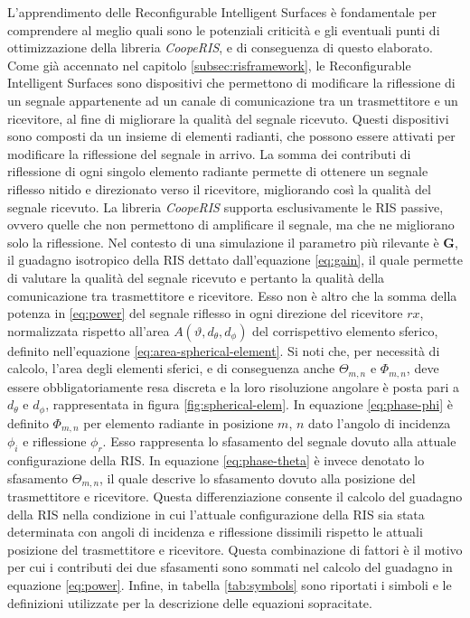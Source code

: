 L'apprendimento delle Reconfigurable Intelligent Surfaces è fondamentale per comprendere
al meglio quali sono le potenziali criticità e gli eventuali punti di ottimizzazione
della libreria \textit{CoopeRIS}, e di conseguenza di questo elaborato. Come già
accennato nel capitolo \ref{subsec:risframework}, le Reconfigurable Intelligent Surfaces
sono dispositivi che permettono di modificare la riflessione di un segnale appartenente
ad un canale di comunicazione tra un trasmettitore e un ricevitore, al fine di
migliorare la qualità del segnale ricevuto. Questi dispositivi sono composti da un
insieme di elementi radianti, che possono essere attivati per modificare la
riflessione del segnale in arrivo. La somma dei contributi di riflessione di ogni
singolo elemento radiante permette di ottenere un segnale riflesso nitido e direzionato
verso il ricevitore, migliorando così la qualità del segnale ricevuto. La libreria
\textit{CoopeRIS} supporta esclusivamente le RIS passive, ovvero quelle che non permettono
di amplificare il segnale, ma che ne migliorano solo la riflessione. Nel contesto
di una simulazione il parametro più rilevante è $\textbf{G}$, il guadagno
isotropico della RIS dettato dall'equazione \ref{eq:gain}, il quale permette di valutare
la qualità del segnale ricevuto e pertanto la qualità della comunicazione tra trasmettitore
e ricevitore. Esso non è altro che la somma della potenza in \ref{eq:power} del
segnale riflesso in ogni direzione del ricevitore $rx$, normalizzata rispetto all'area
$A(\vartheta, d_{\theta}, d_{\phi})$ del corrispettivo elemento sferico,
definito nell'equazione \ref{eq:area-spherical-element}. Si noti che, per
necessità di calcolo, l'area degli elementi sferici, e di conseguenza anche
$\Theta_{m,n}$ e $\Phi_{m,n}$, deve essere obbligatoriamente resa discreta e la loro
risoluzione angolare è posta pari a $d_{\theta}$ e $d_{\phi}$, rappresentata in
figura \ref{fig:spherical-elem}. In equazione \ref{eq:phase-phi} è definito $\Phi
_{m,n}$ per elemento radiante in posizione $m$, $n$ dato l'angolo di incidenza
$\phi_{i}$ e riflessione $\phi_{r}$. Esso rappresenta lo sfasamento del segnale dovuto
alla attuale configurazione della RIS. In equazione \ref{eq:phase-theta} è
invece denotato lo sfasamento $\Theta_{m,n}$, il quale descrive lo sfasamento dovuto
alla posizione del trasmettitore e ricevitore. Questa differenziazione consente
il calcolo del guadagno della RIS nella condizione in cui l'attuale
configurazione della RIS sia stata determinata con angoli di incidenza e
riflessione dissimili rispetto le attuali posizione del trasmettitore e
ricevitore. Questa combinazione di fattori è il motivo per cui i contributi dei due
sfasamenti sono sommati nel calcolo del guadagno in equazione \ref{eq:power}.
Infine, in tabella \ref{tab:symbols} sono riportati i simboli e le definizioni utilizzate
per la descrizione delle equazioni sopracitate.

